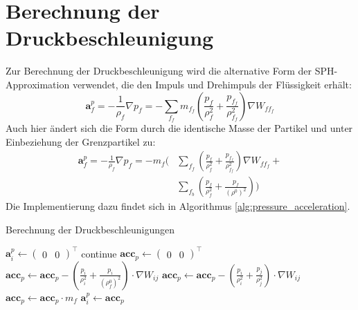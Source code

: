\documentclass[11pt,
a4paper,
parskip=half, %
BCOR=10mm, %
english,
ngerman]{scrreprt}
\begin{document}
\section{Berechnung der Druckbeschleunigung}
Zur Berechnung der Druckbeschleunigung wird die alternative Form der SPH-Approximation verwendet, die den Impuls und Drehimpuls der Flüssigkeit erhält:
\begin{equation}
    \textbf{a}_f^p = -\frac{1}{\rho_f} \nabla p_f = -\sum_{f_f} m_{f_f} \left( \frac{p_f}{\rho_f^2} + \frac{p_{f_f}}{\rho_{f_f}^2} \right) \nabla W_{ff_f}
\end{equation}
Auch hier ändert sich die Form durch die identische Masse der Partikel und unter Einbeziehung der Grenzpartikel zu:
\begin{align}
    \textbf{a}_f^p = -\frac{1}{\rho_f} \nabla p_f = -m_{f} \Biggl(&\sum_{f_f} \left( \frac{p_f}{\rho_f^2} + \frac{p_{f_f}}{\rho_{f_f}^2} \right) \nabla W_{ff_f} +\\
                                                                  &\sum_{f_b} \left( \frac{p_f}{\rho_f^2} + \frac{p_{f}}{(\rho^0)^2} \right) \Biggr)
\end{align}
Die Implementierung dazu findet sich in Algorithmus \ref{alg:pressure_acceleration}.

\begin{algorithm}
    \caption{Berechnung der Druckbeschleunigungen}
    \label{alg:pressure_acceleration}
    \begin{algorithmic}
            \State $\textbf{a}_i^p \gets \begin{pmatrix}0 & 0 \end{pmatrix}^\intercal$
            \State continue
        \EndIf
        \State $\textbf{acc}_p \gets \begin{pmatrix}0 & 0 \end{pmatrix}^\intercal$
        \State
        \State {}
                \State $\textbf{acc}_p \gets \textbf{acc}_p - \left(\frac{p_i}{\rho_i^2} + \frac{p_i}{\left(\rho_f^0\right)^2}\right) \cdot \nabla W_{ij}$ 
            \Else
                \State $\textbf{acc}_p \gets \textbf{acc}_p - \left(\frac{p_i}{\rho_i^2} + \frac{p_j}{\rho_j^2}\right) \cdot \nabla W_{ij}$
            \EndIf
        \EndFor
        \State $\textbf{acc}_p \gets \textbf{acc}_p \cdot m_f$
        \State
        \State $\textbf{a}_i^p \gets \textbf{acc}_p$
    \EndFor
    \end{algorithmic}
\end{algorithm}
\end{document}
